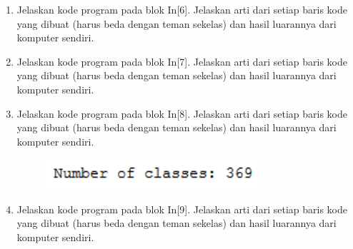 \begin{enumerate}
	

	\item Jelaskan kode program pada blok  In[6]. Jelaskan arti dari setiap baris kode yang dibuat (harus beda dengan teman sekelas) dan hasil luarannya dari komputer sendiri.
	\hfill\break

	

	\item Jelaskan kode program pada blok  In[7]. Jelaskan arti dari setiap baris kode yang dibuat (harus beda dengan teman sekelas) dan hasil luarannya dari komputer sendiri.
	\hfill\break

	

	\item Jelaskan kode program pada blok  In[8]. Jelaskan arti dari setiap baris kode yang dibuat (harus beda dengan teman sekelas) dan hasil luarannya dari komputer sendiri.
	\hfill\break

	
	\begin{figure}[H]
		\includegraphics[width=8cm]{figures/1174006/chapter7/praktek/8.png}
		\centering
	\end{figure}

	\item Jelaskan kode program pada blok  In[9]. Jelaskan arti dari setiap baris kode yang dibuat (harus beda dengan teman sekelas) dan hasil luarannya dari komputer sendiri.
	\hfill\break

	


\end{enumerate}
